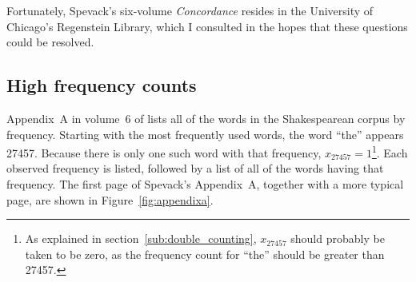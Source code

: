 Fortunately, Spevack's six-volume \textit{Concordance} resides in the University of Chicago's Regenstein Library, which I consulted in the hopes that these questions could be resolved.

\subsection{High frequency counts} %
\label{sub:high_frequency_counts}

Appendix~A in volume~6 of \citeauthor{Spevack:1968qd} lists all of the words in the Shakespearean corpus by frequency.  Starting with the most frequently used words, the word ``the'' appears 27457.  Because there is only one such word with that frequency, $x_{27457}=1$\footnote{As explained in section~\ref{sub:double_counting}, $x_{27457}$ should probably be taken to be zero, as the frequency count for ``the'' should be greater than 27457.}.  Each observed frequency is listed, followed by a list of all of the words having that frequency.  The first page of Spevack's Appendix~A, together with a more typical page, are shown in Figure~\ref{fig:appendixa}.

